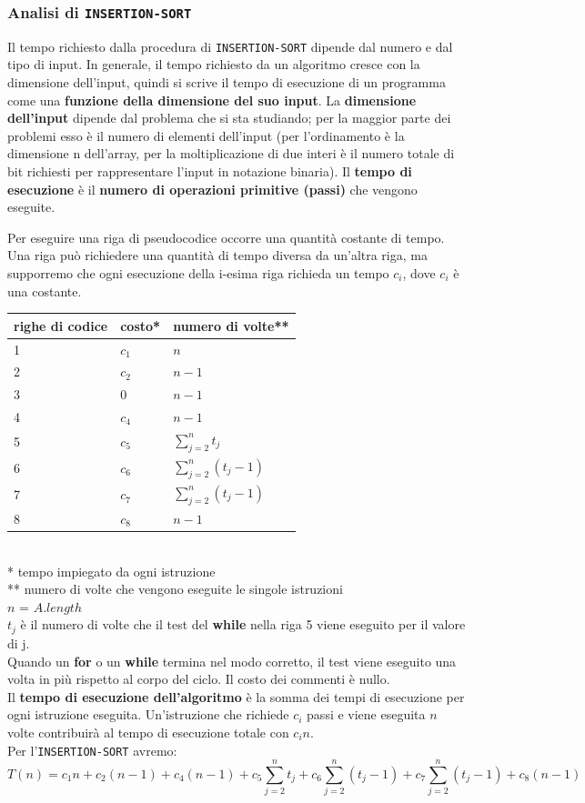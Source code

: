 \documentclass[11pt,a4paper]{article}
\begin{document}
\subsubsection{Analisi di \texttt{INSERTION-SORT}}
Il tempo richiesto dalla procedura di \texttt{INSERTION-SORT} dipende dal numero e dal tipo di input. In generale, il tempo richiesto da un algoritmo cresce con la dimensione dell’input, quindi si scrive il tempo di esecuzione di un programma come una \textbf{funzione della dimensione del suo input}.
La \textbf{dimensione dell’input} dipende dal problema che si sta studiando; per la maggior parte dei problemi esso è il numero di elementi dell’input (per l’ordinamento è la dimensione n dell’array, per la moltiplicazione di due interi è il numero totale di bit richiesti per rappresentare l’input in notazione binaria).
Il \textbf{tempo di esecuzione} è il \textbf{numero di operazioni primitive (passi)} che vengono eseguite.

Per eseguire una riga di pseudocodice occorre una quantità costante di tempo. Una riga può richiedere una quantità di tempo diversa da un’altra riga, ma supporremo che ogni esecuzione della i-esima riga richieda un tempo $c_i$, dove $c_i$ è una costante.\medskip\medskip\\
%
\begin{tabularx}{350pt}{X X X}
  righe di codice & costo* &numero di volte** \\
  \hline
  1 & $c_1$ & $n$ \\
  2 & $c_2$ & $n-1$ \\
  3 & $0$  & $n-1$ \\
  4 & $c_4$ & $n-1$ \\
  5 & $c_5$ & $\sum_{j=2}^{n}t_j$ \\
  6 & $c_6$ & $\sum_{j=2}^{n}(t_j - 1)$ \\
  7 & $c_7$ & $\sum_{j=2}^{n}(t_j - 1)$ \\
  8 & $c_8$ & $n-1$ \\
\end{tabularx}
\medskip\medskip\\
* tempo impiegato da ogni istruzione\\
** numero di volte che vengono eseguite le singole istruzioni\\
$n$ = $A.length$\\
$t_j$ è il numero di volte che il test del \textbf{while} nella riga 5 viene eseguito per il valore di j.\medskip\\
%
Quando un \textbf{for} o un \textbf{while} termina nel modo corretto, il test viene eseguito una volta in più rispetto al corpo del ciclo.
Il costo dei commenti è nullo.\medskip\\
%
Il \textbf{tempo di esecuzione dell’algoritmo} è la somma dei tempi di esecuzione per ogni istruzione eseguita.
Un’istruzione che richiede $c_i$ passi e viene eseguita $n$ volte contribuirà al tempo di esecuzione totale con $c_i n$.\medskip\medskip\\
Per l'\texttt{INSERTION-SORT} avremo:
\[T(n)=c_1n+c_2(n-1)+c_4(n-1)+c_5\sum_{j=2}^{n}t_j+c_6\sum_{j=2}^{n}(t_j - 1)+c_7\sum_{j=2}^{n}(t_j - 1)+c_8(n-1)\]
\end{document}
